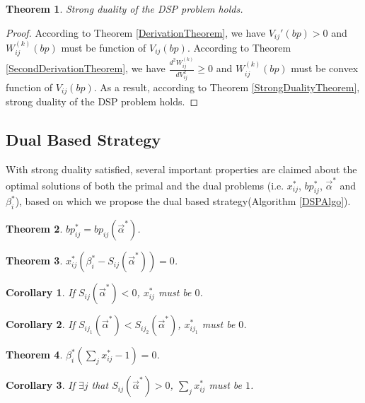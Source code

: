 \documentclass{article}
\newtheorem{theorem}{Theorem}[section]
\newtheorem{corollary}{Corollary}[theorem]
\newcommand{\sx}{x_{ij}}
\newcommand{\sbp}{bp_{ij}}
\newcommand{\sV}{V_{ij}}
\newcommand{\sW}{W_{ij}^{(k)}}
\newcommand{\sbeta}{\beta_i}
\newcommand{\sS}{S_{ij}}
\newcommand{\valpha}{\vec{\alpha}}
\begin{document}
\begin{theorem} \label{DSPStrongDualityTheorem}
Strong duality of the DSP problem holds.
\end{theorem}

\begin{proof}
According to Theorem \ref{DerivationTheorem}, we have $\sV'(bp)>0$ and $\sW(bp)$ must be function of $\sV(bp)$.
According to Theorem \ref{SecondDerivationTheorem}, we have $\frac{d^2\sW}{d\sV^2} \ge 0$ and $\sW(bp)$ must be convex function of $\sV(bp)$.
As a result, according to Theorem \ref{StrongDualityTheorem}, strong duality of the DSP problem holds.
\end{proof}

\subsection{Dual Based Strategy} \label{DSPDualBasedStrategy}

With strong duality satisfied, several important properties
    are claimed about the optimal solutions of both the primal and the dual problems
    (i.e. $\sx^*$, $\sbp^*$, $\valpha^*$ and $\sbeta^*$),
    based on which we propose the dual based strategy(Algorithm \ref{DSPAlgo}).

\begin{theorem}
$\sbp^* = \sbp(\valpha^*)$.
\end{theorem}

\begin{theorem}
$\sx^*(\sbeta^* - \sS(\valpha^*)) = 0$.
\end{theorem}

\begin{corollary}
If $\sS(\valpha^*) < 0$, $\sx^*$ must be $0$.
\end{corollary}

\begin{corollary}
If $S_{ij_1}(\valpha^*) < S_{ij_2}(\valpha^*)$, $x_{ij_1}^*$ must be $0$.
\end{corollary}

\begin{theorem}
$\sbeta^*(\sum\limits_j \sx^* - 1) = 0$.
\end{theorem}

\begin{corollary}
If $\exists j$ that $\sS(\valpha^*) > 0$, $\sum\limits_j \sx^*$ must be $1$.
\end{corollary}
\end{document}
